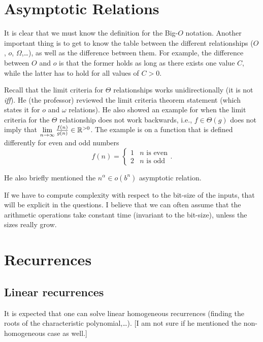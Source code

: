
\section*{Asymptotic Relations}

It is clear that we must know the definition for the Big-$O$ notation.
Another important thing is to get to know the table between the different relationships ($O$, $o$, $\Omega$,\ldots), as well as the difference between them.
For example, the difference between $O$ and $o$ is that the former holds as long as there exists one value $C$, while the latter has to hold for all values of $C>0$.

Recall that the limit criteria for $\Theta$ relationships works unidirectionally (it is not \emph{iff}).
He (the professor) reviewed the limit criteria theorem statement (which states it for $o$ and $\omega$ relations).
He also showed an example for when the limit criteria for the $\Theta$ relationship does not work backwards, i.e., $f \in \Theta(g)$ does not imply that $\lim_{n \to \infty} \frac{f(n)}{g(n)} \in \R^{>0}$. 
The example is on a function that is defined differently for even and odd numbers \[
f(n) = \begin{cases}
    1 & n \text{ is even} \\
    2 & n \text{ is odd}
\end{cases}
.\]

He also briefly mentioned the $n^{\alpha}\in o(b^{n})$ asymptotic relation.

\begin{note}
    If we have to compute complexity with respect to the bit-size of the inputs, that will be explicit in the questions.
    I believe that we can often assume that the arithmetic operations take constant time (invariant to the bit-size), unless the sizes really grow.

\end{note}

\section*{Recurrences}

\subsection*{Linear recurrences}

It is expected that one can solve linear homogeneous recurrences (finding the roots of the characteristic polynomial,\ldots).
[I am not sure if he mentioned the non-homogeneous case as well.]

